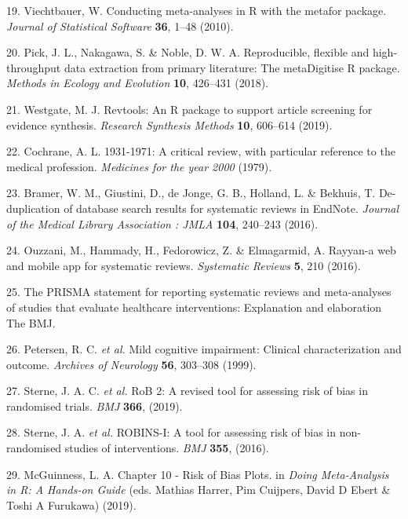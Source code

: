 \documentclass[a4paper, twoside]{templates/ociamthesis}
\begin{document}
\leavevmode\hypertarget{ref-metaforref}{}%
19. Viechtbauer, W. Conducting meta-analyses in R with the metafor package. \emph{Journal of Statistical Software} \textbf{36}, 1--48 (2010).

\leavevmode\hypertarget{ref-pick2018}{}%
20. Pick, J. L., Nakagawa, S. \& Noble, D. W. A. Reproducible, flexible and high-throughput data extraction from primary literature: The metaDigitise R package. \emph{Methods in Ecology and Evolution} \textbf{10}, 426--431 (2018).

\leavevmode\hypertarget{ref-westgate2019revtools}{}%
21. Westgate, M. J. Revtools: An R package to support article screening for evidence synthesis. \emph{Research Synthesis Methods} \textbf{10}, 606--614 (2019).

\leavevmode\hypertarget{ref-cochrane20001931}{}%
22. Cochrane, A. L. 1931-1971: A critical review, with particular reference to the medical profession. \emph{Medicines for the year 2000} (1979).

\leavevmode\hypertarget{ref-bramer2016}{}%
23. Bramer, W. M., Giustini, D., de Jonge, G. B., Holland, L. \& Bekhuis, T. De-duplication of database search results for systematic reviews in EndNote. \emph{Journal of the Medical Library Association : JMLA} \textbf{104}, 240--243 (2016).

\leavevmode\hypertarget{ref-ouzzani2016}{}%
24. Ouzzani, M., Hammady, H., Fedorowicz, Z. \& Elmagarmid, A. Rayyan-a web and mobile app for systematic reviews. \emph{Systematic Reviews} \textbf{5}, 210 (2016).

\leavevmode\hypertarget{ref-zotero-766}{}%
25. The PRISMA statement for reporting systematic reviews and meta-analyses of studies that evaluate healthcare interventions: Explanation and elaboration \textbar{} The BMJ.

\leavevmode\hypertarget{ref-petersen1999}{}%
26. Petersen, R. C. \emph{et al.} Mild cognitive impairment: Clinical characterization and outcome. \emph{Archives of Neurology} \textbf{56}, 303--308 (1999).

\leavevmode\hypertarget{ref-sterne2019}{}%
27. Sterne, J. A. C. \emph{et al.} RoB 2: A revised tool for assessing risk of bias in randomised trials. \emph{BMJ} \textbf{366}, (2019).

\leavevmode\hypertarget{ref-sterne2016}{}%
28. Sterne, J. A. \emph{et al.} ROBINS-I: A tool for assessing risk of bias in non-randomised studies of interventions. \emph{BMJ} \textbf{355}, (2016).

\leavevmode\hypertarget{ref-mcguinness2019}{}%
29. McGuinness, L. A. Chapter 10 - Risk of Bias Plots. in \emph{Doing Meta-Analysis in R: A Hands-on Guide} (eds. Mathias Harrer, Pim Cuijpers, David D Ebert \& Toshi A Furukawa) (2019).
\end{document}
